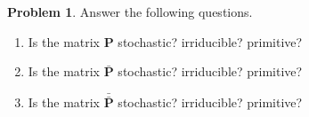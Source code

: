 \documentclass[10pt]{article}
\theoremstyle{definition}
\newtheorem{problem}{Problem}
\newcommand{\p}{\mathbf P}
\newcommand{\pb}{\bar {\p}}
\newcommand{\pbb}{\bar {\pb}}
\begin{document}
\newpage
\begin{problem}
    Answer the following questions.
    \begin{enumerate}
        \item 
            Is the matrix $\p$ stochastic? irriducible? primitive?
            \vspace{3in}
        \item 
            Is the matrix $\pb$ stochastic? irriducible? primitive?
            \vspace{3in}
        \item 
            Is the matrix $\pbb$ stochastic? irriducible? primitive?
            \vspace{3in}
    \end{enumerate}
\end{problem}
\end{document}
